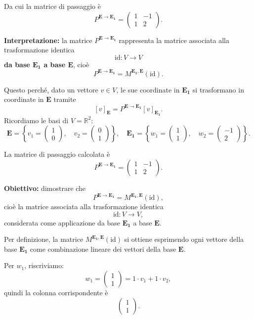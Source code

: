 \documentclass[12pt,a4paper]{article}
\begin{document}
Da cui la matrice di passaggio è
\[
P^{\bm{E} \to \bm{E_1}} = \begin{pmatrix}
1 & -1 \\
1 & 2
\end{pmatrix}.
\]

\vspace{0.3cm}
\textbf{Interpretazione:} la matrice \( P^{\bm{E} \to \bm{E_1}} \) rappresenta la matrice associata alla trasformazione identica
\[
\mathrm{id} : V \to V
\]
\textbf{da base \(\bm{E_1}\) a base \(\bm{E}\)}, cioè  
\[
P^{\bm{E} \to \bm{E_1}} = M^{\bm{E_1}, \bm{E}}(\mathrm{id}).
\]

Questo perché, dato un vettore \( v \in V \), le sue coordinate in \(\bm{E_1}\) si trasformano in coordinate in \(\bm{E}\) tramite
\[
[v]_{\bm{E}} = P^{\bm{E} \to \bm{E_1}} [v]_{\bm{E_1}}.
\]
Ricordiamo le basi di \( V = \mathbb{R}^2 \):
\[
\bm{E} = \left\{ v_1 = \begin{pmatrix} 1 \\ 0 \end{pmatrix}, \quad v_2 = \begin{pmatrix} 0 \\ 1 \end{pmatrix} \right\}, \quad
\bm{E_1} = \left\{ w_1 = \begin{pmatrix} 1 \\ 1 \end{pmatrix}, \quad w_2 = \begin{pmatrix} -1 \\ 2 \end{pmatrix} \right\}.
\]

La matrice di passaggio calcolata è
\[
P^{\bm{E} \to \bm{E_1}} = \begin{pmatrix} 1 & -1 \\ 1 & 2 \end{pmatrix}.
\]

\vspace{0.3cm}
\textbf{Obiettivo:} dimostrare che
\[
P^{\bm{E} \to \bm{E_1}} = M^{\bm{E_1}, \bm{E}}(\mathrm{id}),
\]
cioè la matrice associata alla trasformazione identica
\[
\mathrm{id} : V \to V,
\]
considerata come applicazione da base \(\bm{E_1}\) a base \(\bm{E}\).

\vspace{0.3cm}
Per definizione, la matrice \( M^{\bm{E_1}, \bm{E}}(\mathrm{id}) \) si ottiene esprimendo ogni vettore della base \(\bm{E_1}\) come combinazione lineare dei vettori della base \(\bm{E}\).

Per \( w_1 \), riscriviamo:
\[
w_1 = \begin{pmatrix} 1 \\ 1 \end{pmatrix} = 1 \cdot v_1 + 1 \cdot v_2,
\]
quindi la colonna corrispondente è
\[
\begin{pmatrix} 1 \\ 1 \end{pmatrix}.
\]
\end{document}
